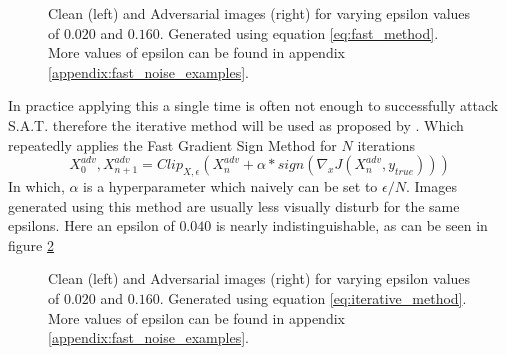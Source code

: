 \begin{figure}[H]
{        %
    }
    \caption{Clean (left) and Adversarial images (right) for varying epsilon values of $0.020$ and $0.160$. Generated using equation \ref{eq:fast_method}. More values of epsilon can be found in appendix \ref{appendix:fast_noise_examples}.}
    \label{fig:fast_noise_examples}
\end{figure}

In practice applying this a single time is often not enough to successfully attack S.A.T. therefore the iterative method will be used as proposed by \citeauthor{Kurakin}. Which repeatedly applies the Fast Gradient Sign Method for $N$ iterations
\begin{equation}
    X^{adv}_{0}, X^{adv}_{n + 1} = Clip_{X, \epsilon}(X^{adv}_{n} + \alpha * sign(\nabla_{x}J(X^{adv}_{n}, y_{true})))
    \label{eq:iterative_method}
\end{equation}
In which, $\alpha$ is a hyperparameter which naively can be set to $\epsilon / N$. Images generated using this method are usually less visually disturb for the same epsilons. Here an epsilon of $0.040$ is nearly indistinguishable, as can be seen in figure \ref{fig:iterative_noise_examples}

\begin{figure}[H]
    \centering
    \vspace{\floatsep}
    \caption{Clean (left) and Adversarial images (right) for varying epsilon values of $0.020$ and $0.160$. Generated using equation \ref{eq:iterative_method}. More values of epsilon can be found in appendix \ref{appendix:fast_noise_examples}.}
    \label{fig:iterative_noise_examples}
\end{figure}



